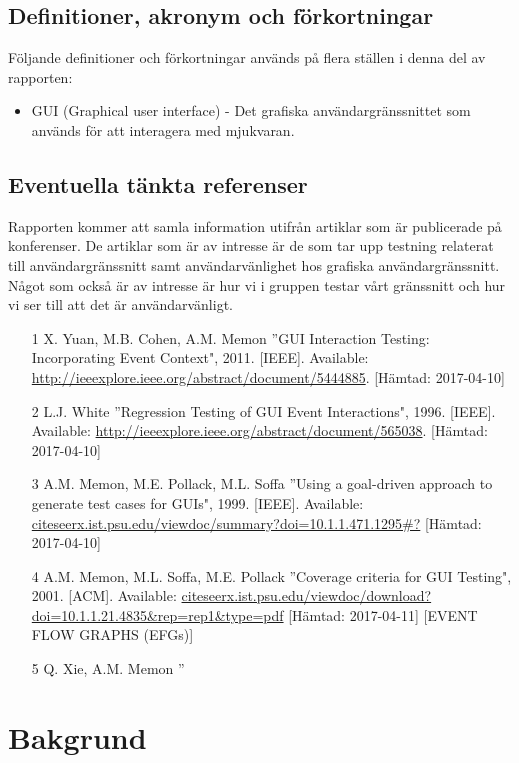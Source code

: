 \subsection{Definitioner, akronym och förkortningar}
Följande definitioner och förkortningar används på flera ställen i denna del av rapporten:
\begin{itemize}
	\item GUI (Graphical user interface) - Det grafiska användargränssnittet som används för att interagera med mjukvaran.
\end{itemize}

\subsection{Eventuella tänkta referenser}

Rapporten kommer att samla information utifrån artiklar som är publicerade på konferenser. De artiklar som är av intresse är de som tar upp testning relaterat till användargränssnitt samt användarvänlighet hos grafiska användargränssnitt. Något som också är av intresse är hur vi i gruppen testar vårt gränssnitt och hur vi ser till att det är användarvänligt.

\begin{itemize}
	\item [1] X. Yuan, M.B. Cohen, A.M. Memon \textquotedblright GUI Interaction Testing: Incorporating Event Context", 2011. [IEEE]. Available: \url{http://ieeexplore.ieee.org/abstract/document/5444885}.	[Hämtad: 2017-04-10]
	\item [2] L.J. White \textquotedblright Regression Testing of GUI Event Interactions", 1996. [IEEE]. Available: \url{http://ieeexplore.ieee.org/abstract/document/565038}.	[Hämtad: 2017-04-10]
	\item [3] A.M. Memon, M.E. Pollack, M.L. Soffa \textquotedblright Using a goal-driven approach to generate test cases for GUIs", 1999. [IEEE]. Available: \url{citeseerx.ist.psu.edu/viewdoc/summary?doi=10.1.1.471.1295#?} [Hämtad: 2017-04-10]
	\item [4] A.M. Memon, M.L. Soffa, M.E. Pollack \textquotedblright Coverage criteria for GUI Testing", 2001. [ACM]. Available: \url{citeseerx.ist.psu.edu/viewdoc/download?doi=10.1.1.21.4835\&rep=rep1\&type=pdf} [Hämtad: 2017-04-11] [EVENT FLOW GRAPHS (EFGs)]
	\item [5] Q. Xie, A.M. Memon \textquotedblright 
\end{itemize}


\section{Bakgrund}
\label{sec:background-holmberg}

